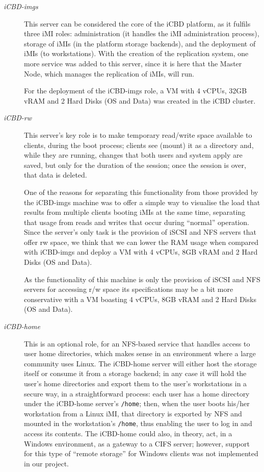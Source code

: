 \begin{description}
	\item [\textit{iCBD-imgs}] This server can be considered the core of the iCBD platform, as it fulfils three iMI roles: administration (it handles the iMI administration process), storage of iMIs (in the platform storage backends), and the deployment of iMIs (to workstations). With the creation of the replication system, one more service was added to this server, since it is here that the Master Node, which manages the replication of iMIs, will run.

	For the deployment of the iCBD-imgs role, a VM with 4 vCPUs, 32GB vRAM and 2 Hard Disks (OS and Data) was created in the iCBD cluster.
	\item [\textit{iCBD-rw}] This server’s key role is to make temporary read/write space available to clients, during the boot process; clients see (mount) it as a directory and, while they are running, changes that both users and system apply are saved, but only for the duration of the session; once the session is over, that data is deleted.

	One of the reasons for separating this functionality from those provided by the iCBD-imgs machine was to offer a simple way to visualise the load that results from multiple clients booting iMIs at the same time, separating that usage from reads and writes that occur during “normal” operation. Since the server’s only task is the provision of iSCSI and NFS servers that offer r\/w space, we think that we can lower the RAM usage when compared with iCBD-imgs and deploy a VM with 4 vCPUs, 8GB vRAM and 2 Hard Disks (OS and Data). 
	
	As the functionality of this machine is only the provision of iSCSI and NFS servers for accessing r/w space its specifications may be a bit more conservative with a VM boasting 4 vCPUs, 8GB vRAM and 2 Hard Disks (OS and Data).
	\item [\textit{iCBD-home}] This is an optional role, for an NFS-based service that handles access to user home directories, which makes sense in an environment where a large community uses Linux. The iCBD-home server will either host the storage itself or consume it from a storage backend; in any case it will hold the user’s home directories and export them to the user’s workstations in a secure way, in a straightforward process: each user has a home directory under the iCBD-home server’s \texttt{/home}; then, when the user boots his/her workstation from a Linux iMI, that directory is exported by NFS and mounted in the workstation’s \texttt{/home}, thus enabling the user to log in and access its contents.
	The iCBD-home could also, in theory, act, in a Windows environment, as a gateway to a CIFS server; however, support for this type of “remote storage” for Windows clients was not implemented in our project.


\end{description}
